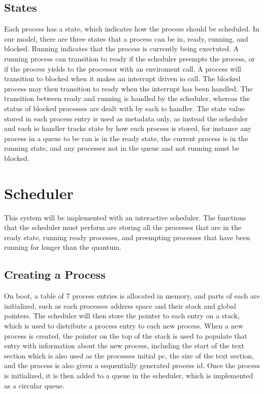 \subsection{States}
Each process has a state, which indicates how the process should be scheduled. In our model, there are three states that a process can be in, ready, running, and blocked. Running indicates that the process is currently being exectuted. A running process can transition to ready if the scheduler preempts the process, or if the process yields to the processor with an enviroment call. A process will transition to blocked when it makes an interrupt driven \ac{io} call. The blocked process may then transition to ready when the interrupt has been handled. The transition between ready and running is handled by the scheduler, whereas the status of blocked processes are dealt with by each \ac{io} handler. The state value stored in each process entry is used as metadata only, as instead the scheduler and each \ac{io} handler tracks state by how each process is stored, for instance any process in a queue to be ran is in the ready state, the current process is in the running state, and any processes not in the queue and not running must be blocked. 
\section{Scheduler}
This system will be implemented with an interactive scheduler. The functions that the scheduler must perform are storing all the processes that are in the ready state, running ready processes, and preempting processes that have been running for longer than the \gls{quantum}.
\subsection{Creating a Process}
On boot, a table of 7 process entries is allocated in memory, and parts of each are initialized, such as each processes address space and their stack and global pointers. The scheduler will then store the pointer to each entry on a stack, which is used to distribute a process entry to each new process. When a new process is created, the pointer on the top of the stack is used to populate that entry with information about the new process, including the start of the text section which is also used as the processes initial pc, the size of the text section, and the process is also given a sequentially generated process id. Once the process is initialized, it is then added to a queue in the scheduler, which is implemented as a circular queue.
